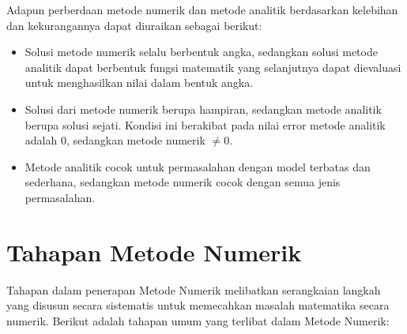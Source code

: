 \documentclass[
]{book}
\providecommand{\tightlist}{%
  \setlength{\itemsep}{0pt}\setlength{\parskip}{0pt}}
\theoremstyle{definition}
\theoremstyle{definition}
\theoremstyle{definition}
\theoremstyle{definition}
\theoremstyle{remark}
\begin{document}
Adapun perberdaan metode numerik dan metode analitik berdasarkan kelebihan dan kekurangannya dapat diuraikan sebagai berikut:

\begin{itemize}
\tightlist
\item
  Solusi metode numerik selalu berbentuk angka, sedangkan solusi metode analitik dapat berbentuk fungsi matematik yang selanjutnya dapat dievaluasi untuk menghasilkan nilai dalam bentuk angka.
\item
  Solusi dari metode numerik berupa hampiran, sedangkan metode analitik berupa solusi sejati. Kondisi ini berakibat pada nilai error metode analitik adalah 0, sedangkan metode numerik \(\neq 0\).
\item
  Metode analitik cocok untuk permasalahan dengan model terbatas dan sederhana, sedangkan metode numerik cocok dengan semua jenis permasalahan.
\end{itemize}

\hypertarget{tahapan-metode-numerik}{%
\section{Tahapan Metode Numerik}\label{tahapan-metode-numerik}}

Tahapan dalam penerapan Metode Numerik melibatkan serangkaian langkah yang disusun secara sistematis untuk memecahkan masalah matematika secara numerik. Berikut adalah tahapan umum yang terlibat dalam Metode Numerik:
\end{document}
